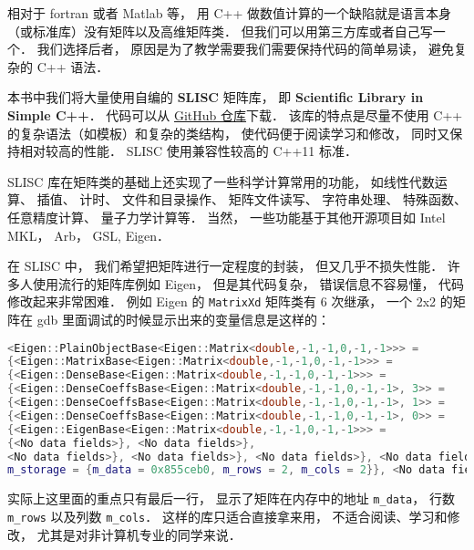 

相对于 fortran 或者 Matlab 等， 用 C++ 做数值计算的一个缺陷就是语言本身（或标准库）没有矩阵以及高维矩阵类． 但我们可以用第三方库或者自己写一个． 我们选择后者， 原因是为了教学需要我们需要保持代码的简单易读， 避免复杂的 C++ 语法．

本书中我们将大量使用自编的 \textbf{SLISC} 矩阵库， 即 \textbf{Scientific Library in Simple C++}． 代码可以从 \href{https://github.com/MacroUniverse/SLISC0}{GitHub 仓库}下载． 该库的特点是尽量不使用 C++ 的复杂语法（如模板）和复杂的类结构， 使代码便于阅读学习和修改， 同时又保持相对较高的性能． SLISC 使用兼容性较高的 C++11 标准．

SLISC 库在矩阵类的基础上还实现了一些科学计算常用的功能， 如线性代数运算、 插值、 计时、 文件和目录操作、 矩阵文件读写、 字符串处理、 特殊函数、 任意精度计算、 量子力学计算等． 当然， 一些功能基于其他开源项目如 Intel MKL， Arb， GSL, Eigen．

在 SLISC 中， 我们希望把矩阵进行一定程度的封装， 但又几乎不损失性能． 许多人使用流行的矩阵库例如 Eigen， 但是其代码复杂， 错误信息不容易懂， 代码修改起来非常困难． 例如 Eigen 的 \verb|MatrixXd| 矩阵类有 6 次继承， 一个 2x2 的矩阵在 gdb 里面调试的时候显示出来的变量信息是这样的：
\begin{lstlisting}[language=cpp]
<Eigen::PlainObjectBase<Eigen::Matrix<double,-1,-1,0,-1,-1>>> = 
{<Eigen::MatrixBase<Eigen::Matrix<double,-1,-1,0,-1,-1>>> = 
{<Eigen::DenseBase<Eigen::Matrix<double,-1,-1,0,-1,-1>>> = 
{<Eigen::DenseCoeffsBase<Eigen::Matrix<double,-1,-1,0,-1,-1>, 3>> = 
{<Eigen::DenseCoeffsBase<Eigen::Matrix<double,-1,-1,0,-1,-1>, 1>> = 
{<Eigen::DenseCoeffsBase<Eigen::Matrix<double,-1,-1,0,-1,-1>, 0>> = 
{<Eigen::EigenBase<Eigen::Matrix<double,-1,-1,0,-1,-1>>> =
{<No data fields>}, <No data fields>}, 
<No data fields>}, <No data fields>}, <No data fields>}, <No data fields>},
m_storage = {m_data = 0x855ceb0, m_rows = 2, m_cols = 2}}, <No data fields>
\end{lstlisting}
实际上这里面的重点只有最后一行， 显示了矩阵在内存中的地址 \verb|m_data|， 行数 \verb|m_rows| 以及列数 \verb|m_cols|． 这样的库只适合直接拿来用， 不适合阅读、学习和修改， 尤其是对非计算机专业的同学来说．


